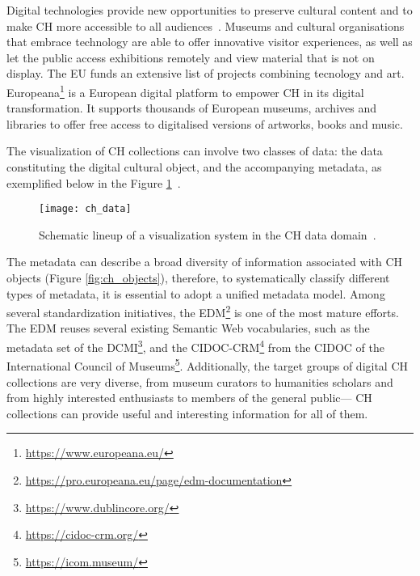 Digital technologies provide new opportunities to preserve cultural content and to make \gls{CH} more accessible to all audiences~\cite{eu_digital_heritage}. Museums and cultural organisations that embrace technology are able to offer innovative visitor experiences, as well as let the public access exhibitions remotely and view material that is not on display.
The \gls{EU} funds an extensive list of projects combining tecnology and art.
Europeana\footnote{\url{https://www.europeana.eu/}} is a European digital platform to empower \gls{CH} in its digital transformation. It supports thousands of European museums, archives and libraries to offer free access to digitalised versions of artworks, books and music.

The visualization of \gls{CH} collections can involve two classes of data: the data constituting the digital cultural object, and
the accompanying metadata, as exemplified below in the Figure \ref{fig:ch_data}~\cite{Windhager2019Visualization}.

\begin{figure}[h!]
    \centering
    \texttt{[image: ch\_data]}
    \caption{Schematic lineup of a visualization system in the CH data domain~\cite{Windhager2019Visualization}.}
    \label{fig:ch_data}
\end{figure}
\FloatBarrier


The metadata can describe a broad diversity of information associated
with \gls{CH} objects (Figure \ref{fig:ch_objects}), therefore, to systematically classify different types of metadata, it is essential to adopt a unified metadata model. 
Among several standardization initiatives, the \gls{EDM}\footnote{\url{https://pro.europeana.eu/page/edm-documentation}} is one of the most mature efforts. 
The \gls{EDM} reuses several existing Semantic Web vocabularies, such as the metadata set of the \gls{DCMI}\footnote{\url{https://www.dublincore.org/}}, and the
\gls{CIDOC-CRM}\footnote{\url{https://cidoc-crm.org/}} from the \gls{CIDOC} of the International Council of Museums\footnote{\url{https://icom.museum/}}. 
Additionally, the target groups of digital CH collections are very diverse, from museum curators to humanities scholars and from
highly interested enthusiasts to members of the general public— \gls{CH} collections can provide useful and interesting information for all of them. 


